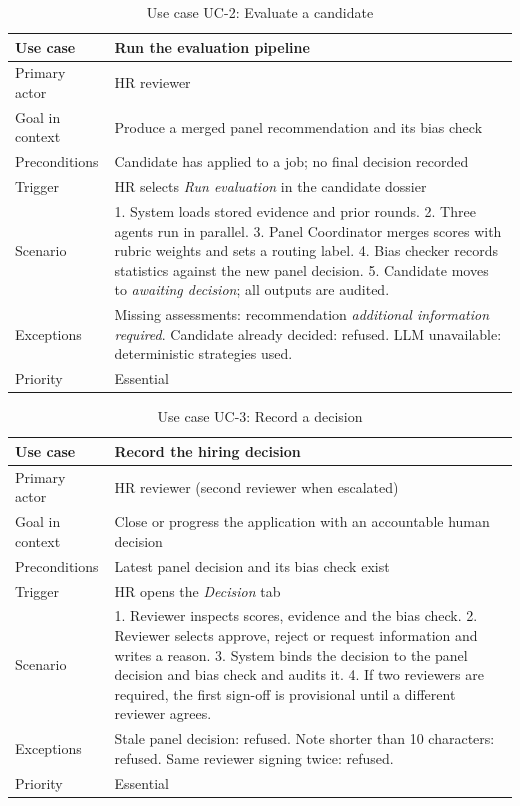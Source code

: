 \begin{table}[H]\centering\small\caption{Use case UC-2: Evaluate a candidate}
\begin{tabular}{|p{3.2cm}|p{11cm}|}\hline
Use case & Run the evaluation pipeline\\ \hline
Primary actor & HR reviewer\\ \hline
Goal in context & Produce a merged panel recommendation and its bias check\\ \hline
Preconditions & Candidate has applied to a job; no final decision recorded\\ \hline
Trigger & HR selects \emph{Run evaluation} in the candidate dossier\\ \hline
Scenario & 1. System loads stored evidence and prior rounds. 2. Three agents run in parallel. 3. Panel Coordinator merges scores with rubric weights and sets a routing label. 4. Bias checker records statistics against the new panel decision. 5. Candidate moves to \emph{awaiting decision}; all outputs are audited.\\ \hline
Exceptions & Missing assessments: recommendation \emph{additional information required}. Candidate already decided: refused. LLM unavailable: deterministic strategies used.\\ \hline
Priority & Essential\\ \hline
\end{tabular}\end{table}

\begin{table}[H]\centering\small\caption{Use case UC-3: Record a decision}
\begin{tabular}{|p{3.2cm}|p{11cm}|}\hline
Use case & Record the hiring decision\\ \hline
Primary actor & HR reviewer (second reviewer when escalated)\\ \hline
Goal in context & Close or progress the application with an accountable human decision\\ \hline
Preconditions & Latest panel decision and its bias check exist\\ \hline
Trigger & HR opens the \emph{Decision} tab\\ \hline
Scenario & 1. Reviewer inspects scores, evidence and the bias check. 2. Reviewer selects approve, reject or request information and writes a reason. 3. System binds the decision to the panel decision and bias check and audits it. 4. If two reviewers are required, the first sign-off is provisional until a different reviewer agrees.\\ \hline
Exceptions & Stale panel decision: refused. Note shorter than 10 characters: refused. Same reviewer signing twice: refused.\\ \hline
Priority & Essential\\ \hline
\end{tabular}\end{table}

